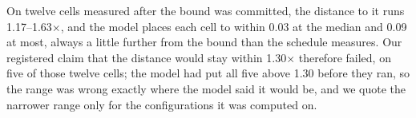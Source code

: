 On twelve cells measured after the bound was committed, the distance to it runs 1.17--1.63$\times$, and the model places each cell to within 0.03 at the median and 0.09 at most, always a little further from the bound than the schedule measures.
Our registered claim that the distance would stay within 1.30$\times$ therefore failed, on five of those twelve cells; the model had put all five above 1.30 before they ran, so the range was wrong exactly where the model said it would be, and we quote the narrower range only for the configurations it was computed on.

